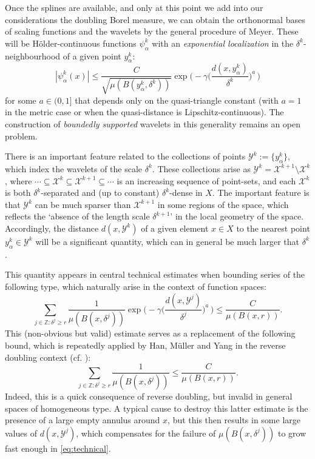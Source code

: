 \documentclass{amsart}
\numberwithin{equation}{section}
\theoremstyle{plain}
\theoremstyle{definition}
\theoremstyle{remark}
\begin{document}
{{Once the splines are available, and only at this point we add into our considerations the doubling Borel measure, we can obtain the orthonormal bases of scaling functions and the wavelets by the general procedure of Meyer. These will be H\"older-continuous functions $\psi^k_\alpha$ with an  \emph{exponential localization} in the $\delta^k$-neighbourhood of a given point $y^k_\alpha$:
\begin{equation*}
  {|{\psi^k_\alpha(x)}|}\leq\frac{C}{\sqrt{\mu(B(y^k_\alpha,\delta^k))}}\exp\Big(-\gamma \Big(\frac{d(x,y^k_\alpha)}{\delta ^{k}}\Big)^a\, \Big)
\end{equation*}
for some $a\in (0,1]$ that depends only on the  quasi-triangle constant (with $a=1$ in the metric case or when the quasi-distance is Lipschitz-continuous).
The construction of \emph{boundedly supported} wavelets in this generality remains an open problem.

There is an important feature related to the collections of points $\mathscr{Y}^k:=\{y^k_\alpha\}$, which index the wavelets of the scale $\delta^k$. These collections arise as $\mathscr{Y}^k=\mathscr{X}^{k+1}\setminus\mathscr{X}^k$, where $\cdots\subseteq\mathscr{X}^k\subseteq\mathscr{X}^{k+1}\subseteq\cdots$ is an increasing sequence of point-sets, and each $\mathscr{X}^k$ is both $\delta^k$-separated and (up to constant) $\delta^k$-dense in $X$. The important feature is that $\mathscr{Y}^k$ can be much sparser than $\mathscr{X}^{k+1}$ in some regions of the space, which reflects the `absence of the length scale $\delta^{k+1}$' in the local geometry of the space. Accordingly, the distance $d(x,\mathscr{Y}^k)$ of a given element $x\in X$ to the nearest point $y^k_\alpha\in\mathscr{Y}^k$ will be a significant quantity, which can in general be much larger that $\delta^k$.

This quantity appears in central technical estimates when bounding series of the following type, which naturally arise in the context of function spaces:
\begin{equation}\label{eq:technical}
  \sum_{j\in{\mathbb{Z}}:\delta^j\geq r}\frac{1}{\mu(B(x,\delta^j))}\exp\Big(-\gamma\Big(\frac{d(x,\mathscr{Y}^j)}{\delta^j}\Big)^a\, \Big)\leq\frac{C}{\mu(B(x,r))}.
\end{equation}
This (non-obvious but valid) estimate serves as a replacement of the following bound, which is repeatedly applied by Han, M\"uller and Yang in the reverse doubling context (cf. \cite[Lemma 3.5]{HMY1}):
\begin{equation*}
  \sum_{j\in{\mathbb{Z}}:\delta^j\geq r}\frac{1}{\mu(B(x,\delta^j))}\leq\frac{C}{\mu(B(x,r))}.
\end{equation*}
Indeed, this is a quick consequence of reverse doubling, but invalid in general spaces of homogeneous type. A typical cause to destroy this latter estimate is the presence of a large empty annulus around $x$, but this then results in some large values of $d(x,\mathscr{Y}^j)$, which compensates for the failure of $\mu(B(x,\delta^j))$ to grow fast enough in \eqref{eq:technical}.

}}
\end{document}
